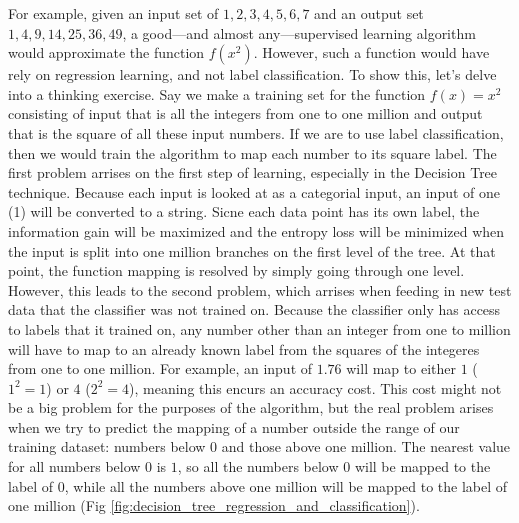 For example, given an input set of ${1,2,3,4,5,6,7}$ and an output set ${1,4,9,14,25,36,49}$, a good---and almost any---supervised learning algorithm would approximate the function $f(x^2)$. However, such a function would have rely on regression learning, and not label classification. To show this, let's delve into a thinking exercise. Say we make a training set for the function $f(x) = x^2$ consisting of input that is all the integers from one to one million and output that is the square of all these input numbers. If we are to use label classification, then we would train the algorithm to map each number to its square label. The first problem arrises on the first step of learning, especially in the Decision Tree technique. Because each input is looked at as a categorial input, an input of one (1) will be converted to a string. Sicne each data point has its own label, the information gain will be maximized and the entropy loss will be minimized when the input is split into one million branches on the first level of the tree. At that point, the function mapping is resolved by simply going through one level. However, this leads to the second problem, which arrises when feeding in new test data that the classifier was not trained on. Because the classifier only has access to labels that it trained on, any number other than an integer from one to million will have to map to an already known label from the squares of the integeres from one to one million. For example, an input of $1.76$ will map to either $1$ ($1^2=1$) or $4$ ($2^2 = 4$), meaning this encurs an accuracy cost. This cost might not be a big problem for the purposes of the algorithm, but the real problem arises when we try to predict the mapping of a number outside the range of our training dataset: numbers below 0 and those above one million. The nearest value for all numbers below 0 is 
$1$, so all the numbers below 0 will be mapped to the label of $0$, while all the numbers above one million will be mapped to the label of one million (Fig \ref{fig:decision_tree_regression_and_classification}).

